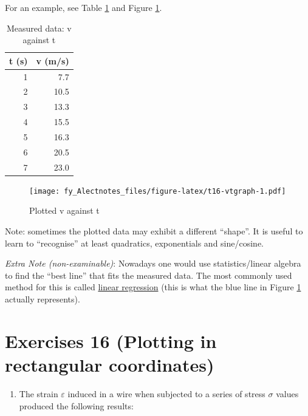 \documentclass[
  12pt,
  oneside]{book}
\providecommand{\tightlist}{%
  \setlength{\itemsep}{0pt}\setlength{\parskip}{0pt}}
\theoremstyle{definition}
\theoremstyle{definition}
\theoremstyle{definition}
\theoremstyle{definition}
\theoremstyle{remark}
\begin{document}
For an example, see Table \ref{tab:t16-vttable} and Figure \ref{fig:t16-vtgraph}.

\begin{table}

\caption{\label{tab:t16-vttable}Measured data: v against t}
\centering
\begin{tabular}[t]{r|r}
\hline
t (s) & v (m/s)\\
\hline
1 & 7.7\\
\hline
2 & 10.5\\
\hline
3 & 13.3\\
\hline
4 & 15.5\\
\hline
5 & 16.3\\
\hline
6 & 20.5\\
\hline
7 & 23.0\\
\hline
\end{tabular}
\end{table}

\begin{figure}
\centering
\texttt{[image: fy\_Alectnotes\_files/figure-latex/t16-vtgraph-1.pdf]}
\caption{\label{fig:t16-vtgraph}Plotted v against t}
\end{figure}

Note: sometimes the plotted data may exhibit a different ``shape''. It is useful
to learn to ``recognise'' at least quadratics, exponentials and sine/cosine.

\emph{Extra Note (non-examinable)}: Nowadays one would use statistics/linear algebra to find the ``best line'' that fits the measured data. The most commonly used method for this is called \href{https://en.wikipedia.org/wiki/Linear_regression}{linear regression} (this is what the blue line in Figure \ref{fig:t16-vtgraph} actually represents).

\hypertarget{exercises-16-plotting-in-rectangular-coordinates}{%
\chapter*{Exercises 16 (Plotting in rectangular coordinates)}\label{exercises-16-plotting-in-rectangular-coordinates}}

\begin{enumerate}
\def\labelenumi{\arabic{enumi}.}
\tightlist
\item
  The strain \(\varepsilon\) induced in a wire when subjected to a series of stress \(\sigma\) values produced the following results:
\end{enumerate}
\end{document}
